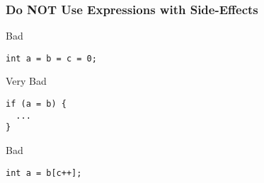 \documentclass[screen]{beamer}
\begin{document}
\begin{frame}[fragile]
\frametitle{Do NOT Use Expressions with Side-Effects}%
\begin{alertblock}{Bad}
\begin{lstlisting}
int a = b = c = 0;
\end{lstlisting}
\end{alertblock}

\begin{alertblock}{Very Bad}
\begin{lstlisting}
if (a = b) {
  ...
}
\end{lstlisting}

\begin{alertblock}{Bad}
\begin{lstlisting}
int a = b[c++];
\end{lstlisting}
\end{alertblock}
\end{alertblock}
\end{frame}
\end{document}
